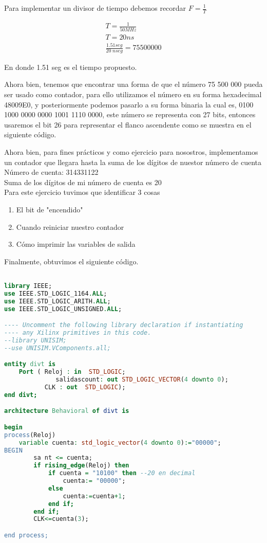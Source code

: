 \documentclass{mylib/reporteConCalif}
\begin{document}
Para implementar un divisor de tiempo debemos recordar $F = \frac{1}{T}$

\begin{gather*}
T = \frac{1}{50 MHz}\\
T = 20 ns \\
\frac{1.51 seg}{20 \;n seg} = 75 500 000
\end{gather*}

En donde 1.51 seg es el tiempo propuesto.

Ahora bien, tenemos que encontrar una forma de que el número 75 500 000 pueda ser usado como contador, para ello utilizamos el número en su forma hexadecimal 48009E0, y posteriormente podemos pasarlo a su forma binaria la cual es, 0100 1000 0000 0000 1001 1110 0000, este número se representa con 27 bits, entonces usaremos el bit 26 para representar el flanco ascendente como se muestra en el siguiente código.

Ahora bien, para fines prácticos y como ejercicio para nosostros, implementamos un contador que llegara hasta la suma de los dígitos de nuestor número de cuenta \\

Número de cuenta: 314331122 \\
Suma de los dígitos de mi número de cuenta es 20 \\

Para este ejercicio tuvimos que identificar 3 cosas

\begin{enumerate}
  \item El bit de "encendido"
  \item Cuando reiniciar nuestro contador
  \item Cómo imprimir las variables de salida
\end{enumerate}

Finalmente, obtuvimos el siguiente código.

\begin{lstlisting}[language=VHDL]

library IEEE;
use IEEE.STD_LOGIC_1164.ALL;
use IEEE.STD_LOGIC_ARITH.ALL;
use IEEE.STD_LOGIC_UNSIGNED.ALL;

---- Uncomment the following library declaration if instantiating
---- any Xilinx primitives in this code.
--library UNISIM;
--use UNISIM.VComponents.all;

entity divt is
    Port ( Reloj : in  STD_LOGIC;
			  salidascount: out STD_LOGIC_VECTOR(4 downto 0);
           CLK : out  STD_LOGIC);
end divt;

architecture Behavioral of divt is

begin
process(Reloj)
	variable cuenta: std_logic_vector(4 downto 0):="00000";
BEGIN
		sa nt <= cuenta;
		if rising_edge(Reloj) then
			if cuenta = "10100" then --20 en decimal
				cuenta:= "00000";
			else
				cuenta:=cuenta+1;
			end if;
		end if;
		CLK<=cuenta(3);

end process;

\end{lstlisting}
\end{document}
